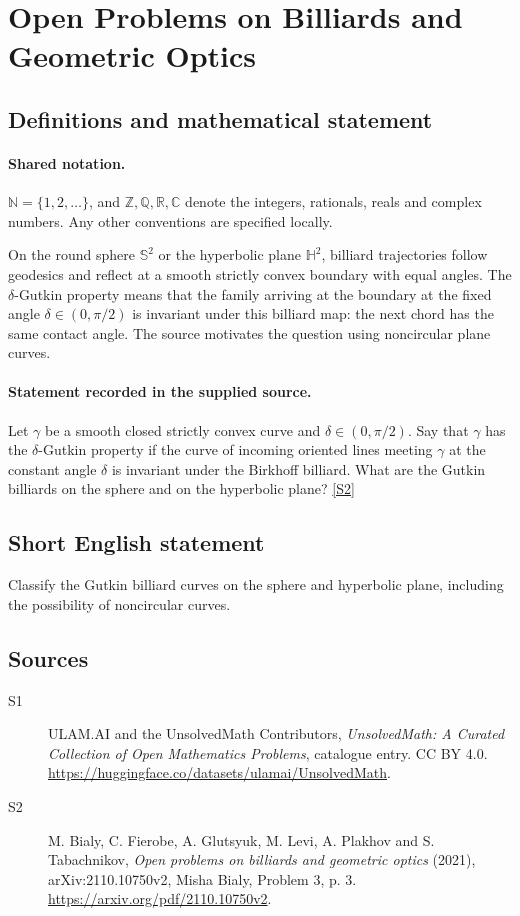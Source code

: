 \documentclass[11pt]{article}
\newcommand{\sref}[2]{\hyperlink{source:#1:#2}{[S#2]}}
\begin{document}
\section{Open Problems on Billiards and Geometric Optics}\label{statement}

\subsection{Definitions and mathematical statement}

\paragraph{Shared notation.}$\mathbb N=\{1,2,\ldots\}$, and $\mathbb Z,\mathbb Q,\mathbb R,\mathbb C$ denote the integers, rationals, reals and complex numbers. Any other conventions are specified locally.


On the round sphere $\mathbb S^2$ or the hyperbolic plane $\mathbb H^2$, billiard trajectories follow geodesics and reflect at a smooth strictly convex boundary with equal angles. The $\delta$-Gutkin property means that the family arriving at the boundary at the fixed angle $\delta\in(0,\pi/2)$ is invariant under this billiard map: the next chord has the same contact angle. The source motivates the question using noncircular plane curves.
\paragraph{Statement recorded in the supplied source.}
Let $\gamma$ be a smooth closed strictly convex curve and $\delta\in(0,\pi/2)$. Say that $\gamma$ has the $\delta$-Gutkin property if the curve of incoming oriented lines meeting $\gamma$ at the constant angle $\delta$ is invariant under the Birkhoff billiard. What are the Gutkin billiards on the sphere and on the hyperbolic plane? \sref{statement}{2}
\subsection{Short English statement}
Classify the Gutkin billiard curves on the sphere and hyperbolic plane, including the possibility of noncircular curves.
\subsection{Sources}
\begin{description}
\item[\hypertarget{source:statement:1}{S1}] ULAM.AI and the UnsolvedMath Contributors, \emph{UnsolvedMath: A Curated Collection of Open Mathematics Problems}, catalogue entry. CC BY 4.0. \url{https://huggingface.co/datasets/ulamai/UnsolvedMath}.
\item[\hypertarget{source:statement:2}{S2}] M. Bialy, C. Fierobe, A. Glutsyuk, M. Levi, A. Plakhov and S. Tabachnikov, \emph{Open problems on billiards and geometric optics} (2021), arXiv:2110.10750v2, Misha Bialy, Problem 3, p. 3. \url{https://arxiv.org/pdf/2110.10750v2}.
\end{description}
\label{end:statement}
\end{document}
